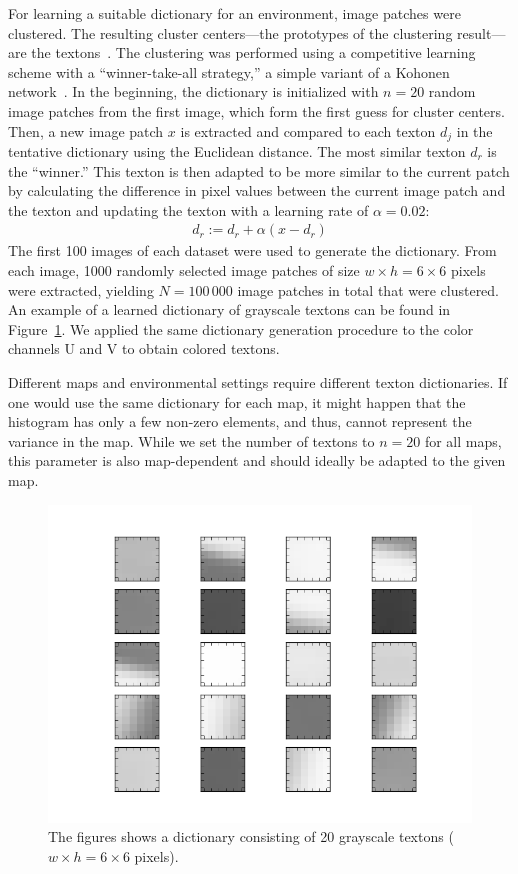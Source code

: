 \documentclass[11pt]{report}
\begin{document}
For learning a suitable dictionary for an environment, image patches
were clustered. The resulting cluster centers---the prototypes of the
clustering result---are the textons~\cite{varma2003texture}. The
clustering was performed using a competitive learning scheme with a
``winner-take-all strategy,'' a simple variant of a Kohonen
network~\cite{kohonen1990self}. In the beginning, the dictionary is
initialized with $n = 20$ random image patches from the first image,
which form the first guess for cluster centers. Then, a new image
patch $x$ is extracted and compared to each texton $d_j$ in the
tentative dictionary using the Euclidean distance. The most similar
texton $d_r$ is the ``winner.'' This texton is then adapted to be more
similar to the current patch by calculating the difference in pixel
values between the current image patch and the texton and updating the
texton with a learning rate of $\alpha = 0.02$:
\begin{align}
  d_r := d_r + \alpha (x - d_r)
\end{align}
The first 100 images of each dataset were used to generate the
dictionary. From each image, 1000 randomly selected image patches of
size $w \times h = 6 \times 6$ pixels were extracted, yielding
$N = 100\,000$ image patches in total that were clustered. An example
of a learned dictionary of grayscale textons can be found in
Figure~\ref{fig:dictionary}. We applied the same dictionary generation
procedure to the color channels U and V to obtain colored textons.

Different maps and environmental settings require different texton
dictionaries. If one would use the same dictionary for each map, it
might happen that the histogram has only a few non-zero elements, and
thus, cannot represent the variance in the map. While we set the
number of textons to $n = 20$ for all maps, this parameter is also
map-dependent and should ideally be adapted to the given map.

\begin{figure}[h!]
\begin{center}
\includegraphics[width=0.7\columnwidth]{dict}
\caption{{\label{fig:dictionary} The figures shows a dictionary
    consisting of 20 grayscale textons ($w \times h = 6 \times 6$
    pixels).}}
\end{center}
\end{figure}
\end{document}
